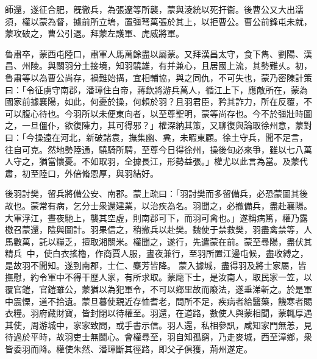 \begin{pinyinscope}
 
 
 
 師還，遂征合肥，旣徹兵，為張遼等所襲，蒙與淩統以死扞衞。後曹公又大出濡須，權以蒙為督，據前所立塢，置彊弩萬張於其上，以拒曹公。曹公前鋒屯未就，蒙攻破之，曹公引退。拜蒙左護軍、虎威將軍。
 
 
 
 
 魯肅卒，蒙西屯陸口，肅軍人馬萬餘盡以屬蒙。又拜漢昌太守，食下雋、劉陽、漢昌、州陵。與關羽分土接境，知羽驍雄，有并兼心，且居國上流，其勢難乆。初，魯肅等以為曹公尚存，禍難始搆，宜相輔協，與之同仇，不可失也，蒙乃密陳計策曰：「令征虜守南郡，潘璋住白帝，蔣欽將游兵萬人，循江上下，應敵所在，蒙為國家前據襄陽，如此，何憂於操，何賴於羽？且羽君臣，矜其詐力，所在反覆，不可以腹心待也。今羽所以未便東向者，以至尊聖明，蒙等尚存也。今不於彊壯時圖之，一旦僵仆，欲復陳力，其可得邪？」權深納其策，又聊復與論取徐州意，蒙對曰：「今操遠在河北，新破諸袁，撫集幽、兾，未暇東顧。徐土守兵，聞不足言，往自可克。然地勢陸通，驍騎所騁，至尊今日得徐州，操後旬必來爭，雖以七八萬人守之，猶當懷憂。不如取羽，全據長江，形勢益張。」權尤以此言為當。及蒙代肅，初至陸口，外倍脩恩厚，與羽結好。
 
 
後羽討樊，留兵將備公安、南郡。蒙上疏曰：「羽討樊而多留備兵，必恐蒙圖其後故也。蒙常有病，乞分士衆還建業，以治疾為名。羽聞之，必撤備兵，盡赴襄陽。大軍浮江，晝夜馳上，襲其空虛，則南郡可下，而羽可禽也。」遂稱病篤，權乃露檄召蒙還，陰與圖計。羽果信之，稍撤兵以赴樊。魏使于禁救樊，羽盡禽禁等，人馬數萬，託以糧乏，擅取湘關米。權聞之，遂行，先遣蒙在前。蒙至尋陽，盡伏其精兵𦩷𦪇中，使白衣搖櫓，作商賈人服，晝夜兼行，至羽所置江邊屯候，盡收縛之，是故羽不聞知。遂到南郡，士仁、麋芳皆降。
 蒙入據城，盡得羽及將士家屬，皆撫慰，約令軍中不得干歷人家，有所求取。蒙麾下士，是汝南人，取民家一笠，以覆官鎧，官鎧雖公，蒙猶以為犯軍令，不可以鄉里故而廢法，遂垂涕斬之。於是軍中震慄，道不拾遺。蒙旦暮使親近存恤耆老，問所不足，疾病者給醫藥，饑寒者賜衣糧。羽府藏財寶，皆封閉以待權至。羽還，在道路，數使人與蒙相聞，蒙輒厚遇其使，周游城中，家家致問，或手書示信。羽人還，私相參訊，咸知家門無恙，見待過於平時，故羽吏士無鬬心。會權尋至，羽自知孤窮，乃走麥城，西至漳鄉，衆皆委羽而降。權使朱然、潘璋斷其徑路，即父子俱獲，荊州遂定。
 

\end{pinyinscope}
